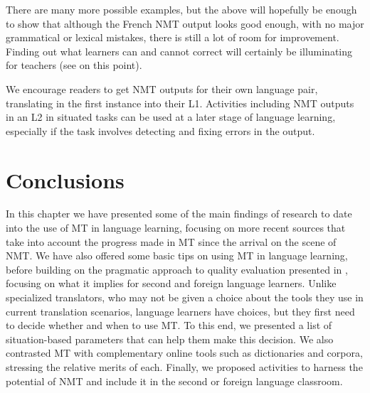 \documentclass[output=paper,colorlinks,citecolor=brown,
]{langscibook}
\begin{document}
\begin{sloppypar}
There are many more possible examples, but the above will hopefully be enough to show that although the French NMT output looks good enough, with no major grammatical or lexical mistakes, there is still a lot of room for improvement. Finding out what learners can and cannot correct will certainly be illuminating for teachers (see \citet{LoockLéchauguette2021} on this point).
\end{sloppypar}

We encourage readers to get NMT outputs for their own language pair, translating in the first instance into their L1. Activities including NMT outputs in an L2 in situated tasks can be used at a later stage of language learning, especially if the task involves detecting and fixing errors in the output.

\section{Conclusions}\label{sec:carre:7}

In this chapter we have presented some of the main findings of research to date into the use of MT in language learning, focusing on more recent sources that take into account the progress made in MT since the arrival on the scene of NMT. We have also offered some basic tips on using MT in language learning, before building on the pragmatic approach to quality evaluation presented in , focusing on what it implies for second and foreign language learners. Unlike specialized translators, who may not be given a choice about the tools they use in current translation scenarios,  language learners have choices, but they first need to decide whether and when to use MT. To this end, we presented a list of situation-based parameters that can help them make this decision. We also contrasted MT with complementary online tools such as dictionaries and corpora, stressing the relative merits of each. Finally, we proposed activities to harness the potential of NMT and include it in the second or foreign language classroom.

\printbibliography[heading=subbibliography,notkeyword=this]
\end{document}
